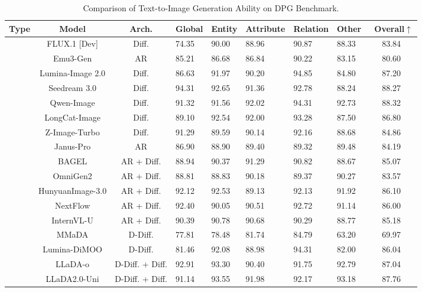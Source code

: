 \begin{table}[!tb]
\centering
\renewcommand{\arraystretch}{1.2}
\setlength\tabcolsep{1pt} %
\small
{}

\caption{Comparison of Text-to-Image Generation Ability on DPG Benchmark.}
\begin{tabularx}{\linewidth}{ccc| *{5}{C}|c} 
\toprule
\textbf{Type} & \textbf{Model} &\textbf{Arch.} & \textbf{Global} & \textbf{Entity} & \textbf{ Attribute} & \textbf{Relation} & \textbf{Other} & \textbf{~Overall$\uparrow$} \\
\midrule
{} 
& FLUX.1 [Dev] & Diff. & 74.35 & 90.00 & 88.96 & 90.87 & 88.33 & 83.84 \\
& Emu3-Gen & AR & 85.21 & 86.68 & 86.84 & 90.22 & 83.15 & 80.60 \\
& Lumina-Image 2.0 & Diff. & 86.63 & 91.97 & 90.20 & 94.85 & 84.80 & 87.20 \\
& Seedream 3.0 & Diff. &94.31 &92.65 &91.36 &92.78 &88.24 &88.27 \\
& Qwen-Image & Diff. &91.32 &91.56 &92.02 &94.31 &92.73 &88.32 \\
&LongCat-Image &Diff. &89.10 &92.54 &92.00 &93.28 &87.50 &86.80\\
& Z-Image-Turbo & Diff. &91.29 &89.59 &90.14 &92.16 &88.68 &84.86 \\

\midrule
{} 
& Janus-Pro & AR & 86.90 & 88.90 & 89.40 & 89.32 & 89.48 & 84.19 \\
& BAGEL & AR + Diff. & 88.94 & 90.37 & 91.29 & 90.82 & 88.67 & 85.07 \\
& OmniGen2 & AR + Diff. & 88.81 & 88.83 & 90.18 & 89.37 & 90.27 & 83.57 \\
& HunyuanImage-3.0 & AR + Diff. &92.12 &92.53 &89.13 &92.13 &91.92 &86.10\\
& NextFlow & AR + Diff. & 92.40 &90.05 &90.51 &92.72 &91.14 & 86.00 \\
& InternVL-U & AR + Diff. & 90.39 & 90.78 & 90.68 & 90.29 & 88.77 &85.18 \\
& MMaDA & D-Diff. & 77.81 & 78.48 & 81.74 & 84.79 & 63.20 & 69.97 \\
& Lumina-DiMOO & D-Diff. & 81.46 & 92.08 & 88.98 & 94.31 & 82.00 & 86.04 \\
& LLaDA-o &D-Diff. + Diff. & 92.91 & 93.30 & 90.40 & 91.75 &92.79 & 87.04 \\
& LLaDA2.0-Uni &D-Diff. + Diff. & 91.14 & 93.55 & 91.98 & 92.17 & 93.18 & 87.76 \\
\bottomrule
\end{tabularx}
\label{table:dpg_benchmark}
\vspace{-0.15in}
\end{table}
